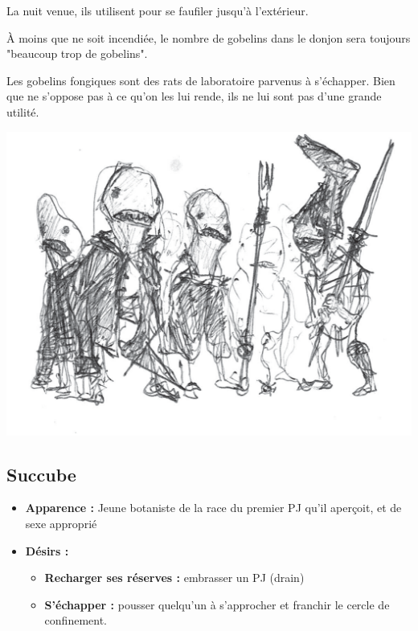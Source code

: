 La nuit venue, ils utilisent \textbf{} pour se faufiler jusqu'à l'extérieur.

À moins que \textbf{} ne soit incendiée, le nombre de gobelins dans le donjon sera toujours "beaucoup trop de gobelins".

Les gobelins fongiques sont des rats de laboratoire parvenus à s'échapper.
Bien que \textbf{} ne s'oppose pas à ce qu'on les lui rende, ils ne lui sont pas d'une grande utilité.

\vfill
\includegraphics[width=\columnwidth]{pics/gob.png}

\pagebreak
\subsection{Succube}\label{monster:n3:succube}
\begin{itemize}
  \item \textbf{Apparence :}  Jeune botaniste de la race du premier PJ qu'il aperçoit, et de sexe approprié
  \item \textbf{ Désirs :}
  \begin{itemize}
    \item \textbf{Recharger ses réserves :} embrasser un PJ (drain)
    \item \textbf{S'échapper :} pousser quelqu'un à s'approcher et franchir le cercle de confinement.
  \end{itemize}
\end{itemize}

